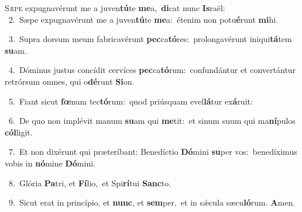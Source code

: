 \lettrine{\initial\textcolor{\initialcolor}{S}}{æpe} expugnavérunt me a juven\-\textbf{tú}\-te \textbf{me}\-a,~\star \textbf{di}\-cat nunc \textbf{Is}\-raël:\\
{\numbfont\textcolor{\numbcolor}{~2.}}~Sæpe expugnavérunt me a juven\-\textbf{tú}\-te \textbf{me}\-a:~\star étenim non potu\-\textbf{é}\-runt \textbf{mi}\-hi.\par
{\numbfont\textcolor{\numbcolor}{~3.}}~Supra dorsum meum fabricavérunt \textbf{pec}\-ca\-\textbf{tó}\-res:~\star prolongavérunt iniqui\-\textbf{tá}\-tem \textbf{su}\-am.\par
{\numbfont\textcolor{\numbcolor}{~4.}}~Dóminus justus concídit cervíces \textbf{pec}\-ca\-\textbf{tó}\-rum:~\star confundántur et convertántur retrórsum omnes, qui o\-\textbf{dé}\-runt \textbf{Si}\-on.\par
{\numbfont\textcolor{\numbcolor}{~5.}}~Fiant sicut \textbf{fœ}\-num tec\-\textbf{tó}\-rum:~\star quod priúsquam evel\-\textbf{lá}\-tur ex\-\textbf{á}\-ruit:\par
{\numbfont\textcolor{\numbcolor}{~6.}}~De quo non implévit manum \textbf{su}\-am qui \textbf{me}\-tit:~\star et sinum suum qui ma\-\textbf{ní}\-pulos \textbf{cól}\-ligit.\par
{\numbfont\textcolor{\numbcolor}{~7.}}~Et non dixérunt qui præteríbant: Benedíctio \textbf{Dó}\-mini \textbf{su}\-per vos:~\star benedíximus vobis in \textbf{nó}\-mine \textbf{Dó}\-mini.\par
{\numbfont\textcolor{\numbcolor}{~8.}}~Glória \textbf{Pa}\-tri, et \textbf{Fí}\-lio,~\star et Spi\-\textbf{rí}\-tui \textbf{Sanc}\-to.\par
{\numbfont\textcolor{\numbcolor}{~9.}}~Sicut erat in princípio, et \textbf{nunc}\-, et \textbf{sem}\-per,~\star et in sǽcula sæcu\-\textbf{ló}\-rum. \textbf{A}\-men.\par

